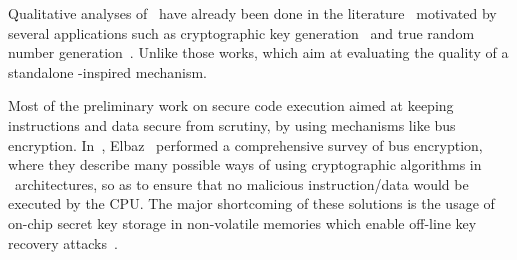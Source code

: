  




Qualitative analyses of \pufs~have already been done in the literature~\cite{Katzenbeisser2012} motivated by several applications such as cryptographic key generation~\cite{Suh2007, Bhargava2014} and true random number generation~\cite{Leest2012, Herrewege2013}. Unlike those works, which aim at evaluating the quality of a standalone \puf-inspired mechanism. %

Most of the preliminary work on secure code execution aimed at keeping instructions and data secure from scrutiny, by using mechanisms like bus encryption. In~\cite{Elbaz2005}, Elbaz \etal~performed a comprehensive survey of bus encryption, where they describe many possible ways of using cryptographic algorithms in \soc~architectures, so as to ensure that no malicious instruction\slash{}data would be executed by the CPU. The major shortcoming of these solutions is the usage of on-chip secret key storage in non-volatile memories which enable off-line key recovery attacks~\cite{towardshardwaresecurity2010}.

